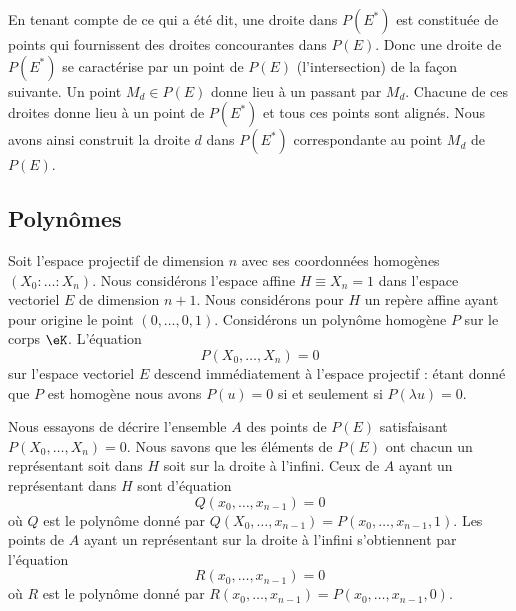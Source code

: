 En tenant compte de ce qui a été dit, une droite dans \( P(E^*)\) est constituée de points qui fournissent des droites concourantes dans \( P(E)\). Donc une droite de \( P(E^*)\) se caractérise par un point de \( P(E)\) (l'intersection) de la façon suivante. Un point \( M_d\in P(E)\) donne lieu à un  passant par \( M_d\). Chacune de ces droites donne lieu à un point de \( P(E^*)\) et tous ces points sont alignés. Nous avons ainsi construit la droite \( d\) dans \( P(E^*)\) correspondante au point \( M_d\) de \( P(E)\).

\subsection{Polynômes}

Soit l'espace projectif de dimension \( n\) avec ses coordonnées homogènes \( (X_0:\ldots :X_n)\). Nous considérons l'espace affine \( H\equiv X_n=1\) dans l'espace vectoriel \( E\) de dimension \( n+1\). Nous considérons pour \( H\) un repère affine ayant pour origine le point \( (0,\ldots, 0,1)\). Considérons un polynôme homogène \( P\) sur le corps \( \eK\). L'équation 
\begin{equation}
    P(X_0,\ldots, X_n)=0
\end{equation}
sur l'espace vectoriel \( E\) descend immédiatement à l'espace projectif : étant donné que \( P\) est homogène nous avons \( P(u)=0\) si et seulement si \( P(\lambda u)=0\).

Nous essayons de décrire l'ensemble \( A\) des points de \( P(E)\) satisfaisant \( P(X_0,\ldots, X_n)=0\). Nous savons que les éléments de \( P(E)\) ont chacun un représentant soit dans \( H\) soit sur la droite à l'infini. Ceux de \( A\) ayant un représentant dans \( H\) sont d'équation
\begin{equation}
    Q(x_0,\ldots, x_{n-1})=0
\end{equation}
où \( Q\) est le polynôme donné par \( Q(X_0,\ldots, x_{n-1})=P(x_0,\ldots, x_{n-1},1)\). Les points de \( A\) ayant un représentant sur la droite à l'infini s'obtiennent par l'équation
\begin{equation}
    R(x_0,\ldots, x_{n-1})=0
\end{equation}
où \( R\) est le polynôme donné par \( R(x_0,\ldots, x_{n-1})=P(x_0,\ldots, x_{n-1},0)\).

